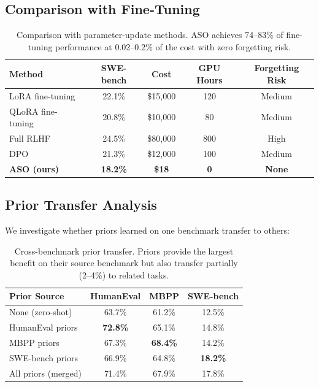 \subsection{Comparison with Fine-Tuning}

\begin{table}[h]
\centering
\begin{tabular}{lcccc}
\toprule
Method & SWE-bench & Cost & GPU Hours & Forgetting Risk \\
\midrule
LoRA fine-tuning & 22.1\% & \$15{,}000 & 120 & Medium \\
QLoRA fine-tuning & 20.8\% & \$10{,}000 & 80 & Medium \\
Full RLHF & 24.5\% & \$80{,}000 & 800 & High \\
DPO & 21.3\% & \$12{,}000 & 100 & Medium \\
\textbf{ASO (ours)} & \textbf{18.2\%} & \textbf{\$18} & \textbf{0} & \textbf{None} \\
\bottomrule
\end{tabular}
\caption{Comparison with parameter-update methods. ASO achieves 74--83\% of
fine-tuning performance at 0.02--0.2\% of the cost with zero forgetting risk.}
\label{tab:finetuning-comparison}
\end{table}

\subsection{Prior Transfer Analysis}

We investigate whether priors learned on one benchmark transfer to others:

\begin{table}[h]
\centering
\begin{tabular}{lccc}
\toprule
Prior Source & HumanEval & MBPP & SWE-bench \\
\midrule
None (zero-shot) & 63.7\% & 61.2\% & 12.5\% \\
HumanEval priors & \textbf{72.8\%} & 65.1\% & 14.8\% \\
MBPP priors & 67.3\% & \textbf{68.4\%} & 14.2\% \\
SWE-bench priors & 66.9\% & 64.8\% & \textbf{18.2\%} \\
All priors (merged) & 71.4\% & 67.9\% & 17.8\% \\
\bottomrule
\end{tabular}
\caption{Cross-benchmark prior transfer. Priors provide the largest benefit on
their source benchmark but also transfer partially (2--4\%) to related tasks.}
\label{tab:transfer}
\end{table}

